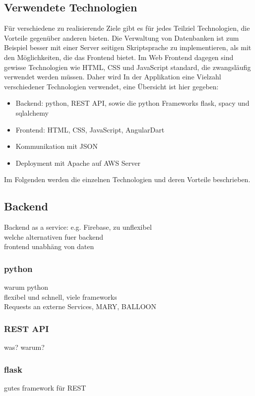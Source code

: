 \subsection{Verwendete Technologien}
Für verschiedene zu realisierende Ziele gibt es für jedes Teilziel Technologien, die Vorteile gegenüber anderen bieten. Die Verwaltung von Datenbanken ist zum Beispiel besser mit einer Server seitigen Skriptsprache zu implementieren, als mit den Möglichkeiten, die das Frontend bietet. Im Web Frontend dagegen sind gewisse Technologien wie HTML, CSS und JavaScript standard, die zwangsläufig verwendet werden müssen. Daher wird In der Applikation eine Vielzahl verschiedener Technologien verwendet, eine Übersicht ist hier gegeben:

\begin{itemize}
	\item Backend: python, REST API, sowie die python Frameworks flask, spacy und sqlalchemy
	\item Frontend: HTML, CSS, JavaScript, AngularDart
	\item Kommunikation mit JSON
	\item Deployment mit Apache auf AWS Server
\end{itemize}

Im Folgenden werden die einzelnen Technologien und deren Vorteile beschrieben.

\subsection{Backend}
Backend as a service: e.g. Firebase, zu unflexibel\\

welche alternativen fuer backend\\
frontend unabhäng von daten

\subsubsection{python}
warum python\\
flexibel und schnell, viele frameworks\\
Requests an externe Services, MARY, BALLOON

\subsubsection{REST API}
was? warum?

\subsubsection{flask}
gutes framework für REST

